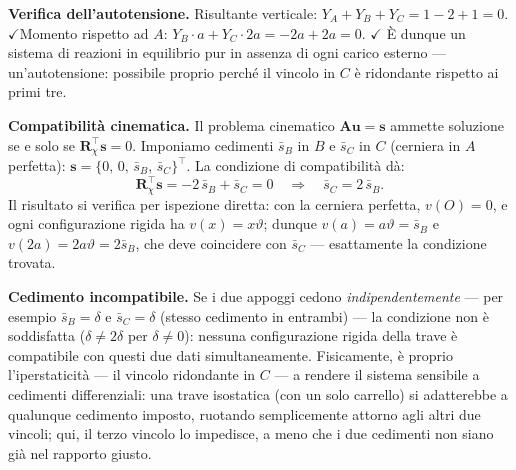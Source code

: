 \begin{esempio}
\begin{svolgimento}
		\noindent\textbf{Verifica dell'autotensione.}
		Risultante verticale: $Y_A+Y_B+Y_C=1-2+1=0$.
		\;$\checkmark$\quad Momento rispetto ad $A$:
		$Y_B\cdot a+Y_C\cdot 2a=-2a+2a=0$. \;$\checkmark$
		È dunque un sistema di reazioni in equilibrio pur in
		assenza di ogni carico esterno --- un'autotensione:
		possibile proprio perché il vincolo in $C$ è ridondante
		rispetto ai primi tre.
		
		\noindent\textbf{Compatibilità cinematica.}
		Il problema cinematico $\bm A\bm u=\bm s$ ammette
		soluzione se e solo se $\bm R_\chi^\top\bm s=0$.
		Imponiamo cedimenti $\bar s_B$ in $B$ e $\bar s_C$ in
		$C$ (cerniera in $A$ perfetta):
		$\bm s=\{0,\,0,\,\bar s_B,\,\bar s_C\}^\top$. La
		condizione di compatibilità dà:
		\begin{equation*}
			\bm R_\chi^\top\bm s =
			-2\,\bar s_B+\bar s_C = 0
			\quad\Longrightarrow\quad
			\bar s_C = 2\,\bar s_B.
		\end{equation*}
		Il risultato si verifica per ispezione diretta: con la
		cerniera perfetta, $v(O)=0$, e ogni configurazione
		rigida ha $v(x)=x\vartheta$; dunque
		$v(a)=a\vartheta=\bar s_B$ e $v(2a)=2a\vartheta=2\bar
		s_B$, che deve coincidere con $\bar s_C$ --- esattamente
		la condizione trovata.
		
		\vspace{6pt}
		\noindent\textbf{Cedimento incompatibile.}
		Se i due appoggi cedono \emph{indipendentemente} ---
		per esempio $\bar s_B=\delta$ e $\bar s_C=\delta$
		(stesso cedimento in entrambi) --- la condizione non è
		soddisfatta ($\delta\neq 2\delta$ per $\delta\neq0$):
		nessuna configurazione rigida della trave è compatibile
		con questi due dati simultaneamente. Fisicamente, è
		proprio l'iperstaticità --- il vincolo ridondante in
		$C$ --- a rendere il sistema sensibile a cedimenti
		differenziali: una trave isostatica (con un solo
		carrello) si adatterebbe a qualunque cedimento
		imposto, ruotando semplicemente attorno agli altri due
		vincoli; qui, il terzo vincolo lo impedisce, a meno che
		i due cedimenti non siano già nel rapporto giusto.
		
	\end{svolgimento}
\end{esempio}

